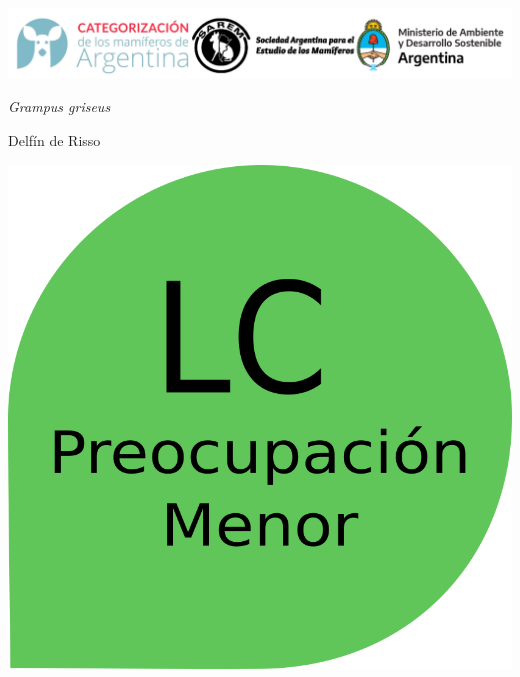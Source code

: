 \documentclass[
  x11names]{article}
\author{}
\date{\vspace{-2.5em}Fecha de creación: 03 April, 2023}
\begin{document}
\setmainfont{Arial}
\setsansfont{Arial}
\setmonofont{Arial}

\newcommand\invisiblesection[1]{%
  \refstepcounter{section}%
  \addcontentsline{toc}{section}{\protect\numberline{\thesection}#1}%
  \sectionmark{#1}}


%
\vspace{-0.4cm}

\includegraphics[width=1\linewidth]{images/Base_info/logo}

\vspace{1cm}

\begin{minipage}{0.7\textwidth}
\vspace{0.3cm}
\fontsize{20}{24}\selectfont\textit{Grampus griseus}

\vspace{0.3cm}
\fontsize{30}{36}\selectfont Delfín de Risso
\end{minipage}
\hspace{0.05\textwidth}
\begin{minipage}{0.25\textwidth}
\includegraphics[width=\textwidth]{images/lc.png}
\end{minipage}
\end{document}
